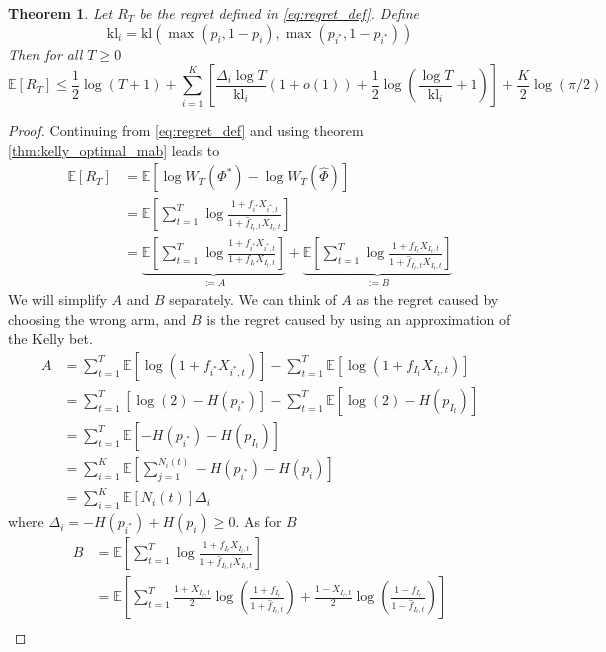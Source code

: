 \documentclass[letterpaper]{article}
\numberwithin{equation}{section}
\theoremstyle{plain}
\newtheorem{theorem}{Theorem}[section]
\begin{document}
\begin{theorem}
Let $R_T$ be the regret defined in \eqref{eq:regret_def}. Define
\begin{equation}
\text{kl}_i = \text{kl}(\max(p_i,1-p_i),\max(p_{i^*}, 1-p_{i^*}))
\end{equation}
Then for all $T\ge 0$
\begin{equation}
\mathbb{E}[R_T] \le \frac{1}{2}\log(T+1) + \sum_{i=1}^K \left[\frac{\Delta_i\log T}{\text{kl}_i}(1+o(1)) + \frac{1}{2} \log\left(\frac{\log T}{\text{kl}_i} + 1\right) \right] + \frac{K}{2} \log(\pi/2) 
\end{equation}
\end{theorem}
\begin{proof}
Continuing from \eqref{eq:regret_def} and using theorem \ref{thm:kelly_optimal_mab} leads to
\begin{align}
\mathbb{E}[R_T] &= \mathbb{E}\left[\log W_T(\Phi^*) - \log W_T(\hat{\Phi})\right]\\
&=\mathbb{E}\left[\sum_{t=1}^T \log \frac{1+f_{i^*}X_{i^*,t}}{1+\hat{f}_{I_t,t}X_{I_t,t}} \right]\\
&=\underbrace{\mathbb{E}\left[\sum_{t=1}^T \log \frac{1+f_{i^*}X_{i^*,t}}{1+f_{I_t} X_{I_t,t}}\right]}_{:=A} + \underbrace{\mathbb{E}\left[\sum_{t=1}^T \log \frac{1+f_{I_t}X_{I_t,t}}{1+\hat{f}_{I_t,t}X_{I_t,t}} \right]}_{:=B}
\end{align}
We will simplify $A$ and $B$ separately. We can think of $A$ as the regret caused by choosing the wrong arm, and $B$ is the regret caused by using an approximation of the Kelly bet.
\begin{align}
A &= \sum_{t=1}^T \mathbb{E}[\log(1+f_{i^*}X_{i^*,t})] - \sum_{t=1}^T \mathbb{E}[\log(1+f_{I_t} X_{I_t,t})]\\
&= \sum_{t=1}^T  [\log(2) - H(p_{i^*})] - \sum_{t=1}^T \mathbb{E}[\log(2) - H(p_{I_t})]\\
&= \sum_{t=1}^T \mathbb{E}[-H(p_{i^*}) - H(p_{I_t})]\\
&= \sum_{i=1}^K \mathbb{E}\left[\sum_{j=1}^{N_i(t)} -H(p_{i^*}) - H(p_i) \right]\\
&= \sum_{i=1}^K \mathbb{E}[N_i(t)] \Delta_i
\end{align}
where $\Delta_i = - H(p_{i^*}) + H(p_i) \ge 0$. As for $B$
\begin{align}
B &=\mathbb{E}\left[\sum_{t=1}^T \log \frac{1+f_{I_t}X_{I_t,t}}{1+\hat{f}_{I_t,t}X_{I_t,t}} \right]\\
&= \mathbb{E}\left[\sum_{t=1}^T\frac{1+X_{I_t,t}}{2} \log\left(\frac{1+f_{I_t}}{1+\hat{f}_{I_t,t}}\right) + \frac{1-X_{I_t,t}}{2}\log\left(\frac{1-f_{I_t}}{1-\hat{f}_{I_t,t}}\right) \right]\\

\end{align}
\end{proof}
\end{document}
